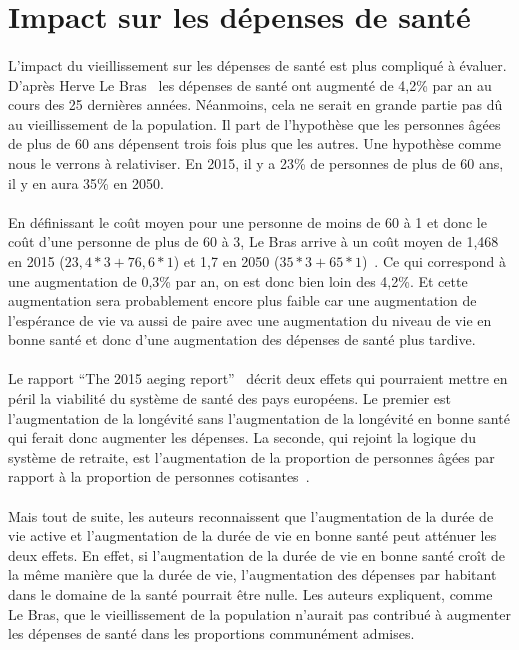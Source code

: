 \section{Impact sur les dépenses de santé}
\paragraph{}L’impact du vieillissement sur les dépenses de santé est plus compliqué à évaluer. D’après Herve Le Bras~\citep[pp.31]{heran} les dépenses de santé ont augmenté de 4,2\% par an au cours des 25 dernières années. Néanmoins, cela ne serait en grande partie pas dû au vieillissement de la population. Il part de l’hypothèse que les personnes âgées de plus de 60 ans dépensent trois fois plus que les autres. Une hypothèse comme nous le verrons à relativiser. En 2015, il y a 23\% de personnes de plus de 60 ans, il y en aura 35\% en 2050.


\paragraph{}En définissant le coût moyen pour une personne de moins de 60 à 1 et donc le coût d’une personne de plus de 60 à 3, Le Bras arrive à un coût moyen de 1,468 en 2015 ($23,4 * 3 + 76,6 * 1$) et 1,7 en 2050 ($35 * 3 + 65 *1$)~\citep[pp.31]{heran}. Ce qui correspond à une augmentation de 0,3\% par an, on est donc bien loin des 4,2\%. Et cette augmentation sera probablement encore plus faible car une augmentation de l’espérance de vie va aussi de paire avec une augmentation du niveau de vie en bonne santé et donc d’une augmentation des dépenses de santé plus tardive. 

\paragraph{}Le rapport “The 2015 aeging report”~\citep{ageing} décrit deux effets qui pourraient mettre en péril la viabilité du système de santé des pays européens. Le premier est l’augmentation de la longévité sans l’augmentation de la longévité en bonne santé qui ferait donc augmenter les dépenses. La seconde, qui rejoint la logique du système de retraite, est l’augmentation de la proportion de personnes âgées par rapport à la proportion de personnes cotisantes~\citep[pp.116]{ageing}.   

\paragraph{}Mais tout de suite, les auteurs reconnaissent que l’augmentation de la durée de vie active et l’augmentation de la durée de vie en bonne santé peut atténuer les deux effets. En effet, si l’augmentation de la durée de vie en bonne santé croît de la même manière que la durée de vie, l’augmentation des dépenses par habitant dans le domaine de la santé pourrait être nulle.  Les auteurs expliquent, comme Le Bras, que le vieillissement de la population n’aurait pas contribué à augmenter les dépenses de santé dans les proportions communément admises.~\citep[pp.116]{ageing} 

